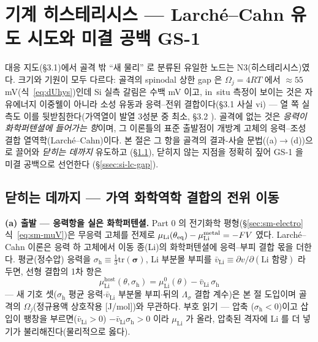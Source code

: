 \section{기계 히스테리시스 --- Larché--Cahn 유도 시도와 미결 공백 GS-1}\label{sec:si-mech}
대응 지도(§3.1)에서 골격 밖 ``새 물리'' 로 분류된 유일한 노드는 N3(히스테리시스)였다. 크기와 기원이
모두 다르다: 골격의 spinodal 상한 gap 은 $\Omega_j{=}4RT$ 에서 $\approx55$ mV(식~\eqref{eq:dUhys})인데
Si 실측 갈림은 수백 mV 이고\cite{obrovac_chevrier2014}, in~situ 측정이 보이는 것은 자유에너지
이중웰이 아니라 소성 유동과 응력--전위 결합이다(§3.1 사실 vi) --- 열 쪽 실측도 이를 뒷받침한다(가역열이
발열 3성분 중 최소, §3.2 \cite{arnot_calorimetry2021}). 골격에 없는 것은 \emph{응력이 화학퍼텐셜에 들어가는
항}이며, 그 이론틀의 표준 출발점이 개방계 고체의 응력--조성 결합 열역학(Larché--Cahn)이다\cite{larchecahn1973}.
본 절은 그 항을 골격의 결과-사슬 문법((a)$\to$(d))으로 끌어와 \emph{닫히는 데까지} 유도하고
(\S\ref{ssec:si-lc-derive}), 닫히지 않는 지점을 정확히 짚어 GS-1 을 미결 공백으로 선언한다
(\S\ref{ssec:si-lc-gap}).

\subsection{닫히는 데까지 --- 가역 화학역학 결합의 전위 이동}\label{ssec:si-lc-derive}
\textbf{(a) 출발 --- 응력항을 실은 화학퍼텐셜.} Part 0 의 전기화학 평형(\S\ref{sec:sm-electro}
식~\eqref{eq:sm-muV})은 무응력 고체를 전제로 $\mu_\mathrm{Li}(\theta_{\mathrm{eq}})-\mu_\mathrm{Li}^\mathrm{metal}
=-FV$ 였다. Larché--Cahn 이론은 응력 하 고체에서 이동 종(Li)의 화학퍼텐셜에 응력--부피 결합 몫을
더한다\cite{larchecahn1973}. 평균(정수압) 응력을 $\sigma_\mathrm{h}\equiv\tfrac13\mathrm{tr}(\bm\sigma)$,
Li 부분몰 부피를 $\bar v_\mathrm{Li}\equiv\partial v/\partial(\text{Li 함량})$ 라 두면, 선형
결합의 1차 항은
\begin{equation}
\mu_\mathrm{Li}^\mathrm{host}(\theta,\sigma_\mathrm{h})
=\mu_\mathrm{Li}^{0}(\theta)-\bar v_\mathrm{Li}\,\sigma_\mathrm{h}
\label{eq:si-lcmu}
\end{equation}
--- 새 기호 셋($\sigma_\mathrm{h}$ 평균 응력$\cdot$$\bar v_\mathrm{Li}$ 부분몰 부피$\cdot$뒤의 $\Lambda_\sigma$
결합 계수)은 본 절 도입이며 골격의 $\Omega_j$(정규용액 상호작용 [J/mol])와 무관하다. 부호 읽기 --- 압축
($\sigma_\mathrm{h}<0$)이고 삽입이 팽창을 부르면($\bar v_\mathrm{Li}>0$) $-\bar v_\mathrm{Li}\sigma_\mathrm{h}>0$
이라 $\mu_\mathrm{Li}$ 가 올라, 압축된 격자에 Li 를 더 넣기가 불리해진다(물리적으로 옳다).

